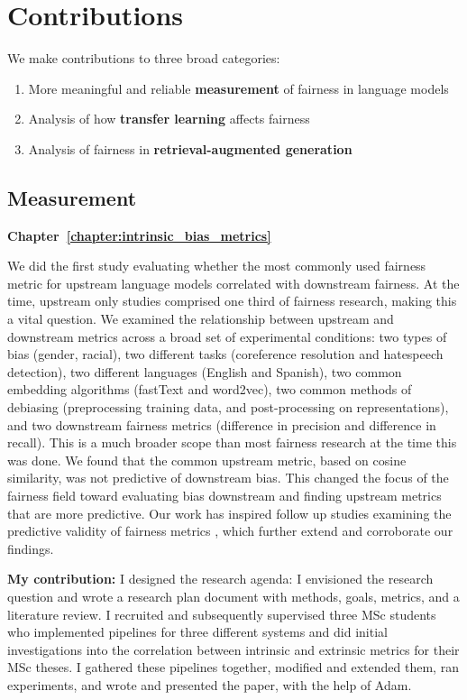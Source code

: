 \section{Contributions}
We make contributions to three broad categories: 
\begin{enumerate}
    \item More meaningful and reliable \textbf{measurement} of fairness in language models
    \item Analysis of how \textbf{transfer learning} affects fairness
    \item Analysis of fairness in \textbf{retrieval-augmented generation}    
\end{enumerate}

\subsection{Measurement} 
\textbf{Chapter~\ref{chapter:intrinsic_bias_metrics}}

We did the first study evaluating whether the most commonly used fairness metric for upstream language models correlated with downstream fairness. At the time, upstream only studies comprised one third of fairness research, making this a vital question. We examined the relationship between upstream and downstream metrics across a broad set of experimental conditions: two types of bias (gender, racial), two different tasks (coreference resolution and hatespeech detection), two different languages (English and Spanish), two common embedding algorithms (fastText and word2vec), two common methods of debiasing (preprocessing training data, and post-processing on representations), and two downstream fairness metrics (difference in precision and difference in recall). This is a much broader scope than most fairness research at the time this was done. We found that the common upstream metric, based on cosine similarity, was not predictive of downstream bias. This changed the focus of the fairness field toward evaluating bias downstream and finding upstream metrics that are more predictive. Our work has inspired follow up studies examining the predictive validity of fairness metrics \citep{cao-etal-2022-intrinsic, others?}, which further extend and corroborate our findings. 

\textbf{My contribution:} I designed the research agenda: I envisioned the research question and wrote a research plan document with methods, goals, metrics, and a literature review. I recruited and subsequently supervised three MSc students who implemented pipelines for three different systems and did initial investigations into the correlation between intrinsic and extrinsic metrics for their MSc theses. I gathered these pipelines together, modified and extended them, ran experiments, and wrote and presented the paper, with the help of Adam. 


